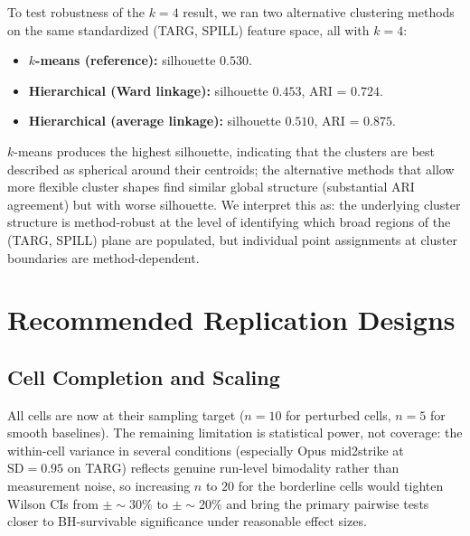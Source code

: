 \documentclass{article}
\begin{document}
To test robustness of the $k=4$ result, we ran two alternative clustering methods on the same standardized (TARG, SPILL) feature space, all with $k=4$:

\begin{itemize}[leftmargin=*, itemsep=1pt, topsep=2pt]
  \item \textbf{$k$-means (reference):} silhouette $0.530$.
  \item \textbf{Hierarchical (Ward linkage):} silhouette $0.453$, ARI = $0.724$.
  \item \textbf{Hierarchical (average linkage):} silhouette $0.510$, ARI = $0.875$.
\end{itemize}

$k$-means produces the highest silhouette, indicating that the clusters are best described as spherical around their centroids; the alternative methods that allow more flexible cluster shapes find similar global structure (substantial ARI agreement) but with worse silhouette. We interpret this as: the underlying cluster structure is method-robust at the level of identifying which broad regions of the (TARG, SPILL) plane are populated, but individual point assignments at cluster boundaries are method-dependent.

\section{Recommended Replication Designs}
\label{sec:appx-future}

\subsection{Cell Completion and Scaling}

All cells are now at their sampling target ($n=10$ for perturbed cells, $n=5$ for smooth baselines). The remaining limitation is statistical power, not coverage: the within-cell variance in several conditions (especially Opus mid2strike at $\mathrm{SD}=0.95$ on TARG) reflects genuine run-level bimodality rather than measurement noise, so increasing $n$ to $20$ for the borderline cells would tighten Wilson CIs from $\pm \sim 30\%$ to $\pm \sim 20\%$ and bring the primary pairwise tests closer to BH-survivable significance under reasonable effect sizes.
\end{document}
